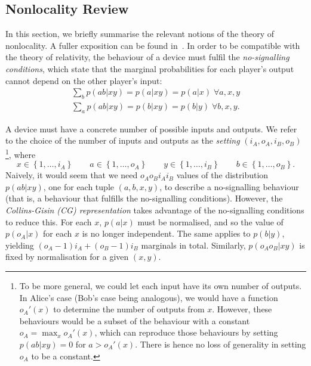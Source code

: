 \documentclass[10pt, a4paper]{article}
\numberwithin{equation}{section} %
\theoremstyle{definition}
\theoremstyle{plain}
\newcommand{\dintv}[2]{\left\{#1,\ldots,#2\right\}}
\newcommand{\?}{\mathrel{?}} %
\begin{document}
  \subsection{Nonlocality Review}\label{sec:pre_nl}

  In this section, we briefly summarise the relevant notions of the theory of nonlocality. A fuller exposition can be found in~\cite{BellNonlocality}. In order to be compatible with the theory of relativity, the behaviour of a device must fulfil the \emph{no-signalling conditions}, which state that the marginal probabilities for each player's output cannot depend on the other player's input:
  \begin{gather}
    \sum_b p(ab|xy) = p(a|xy) = p(a|x)\;\forall a,x,y \\
    \sum_a p(ab|xy) = p(b|xy) = p(b|y)\;\forall b,x,y.
  \end{gather}

  A device must have a concrete number of possible inputs and outputs. We refer to the choice of the number of inputs and outputs as the \emph{setting} \((i_A, o_A, i_B, o_B)\)\footnote{To be more general, we could let each input have its own number of outputs. In Alice's case (Bob's case being analogous), we would have a function \(o_A'(x)\) to determine the number of outputs from \(x\). However, these behaviours would be a subset of the behaviour with a constant \(o_A = \max_x o_A'(x)\), which can reproduce those behaviours by setting \(p(ab|xy) = 0\) for \(a > o_A'(x)\). There is hence no loss of generality in setting \(o_A\) to be a constant.}, where
  \[ x \in \dintv{1}{i_A} \qquad a \in \dintv{1}{o_A} \qquad y \in \dintv{1}{i_B} \qquad b \in \dintv{1}{o_B}. \]
  Naively, it would seem that we need \(o_A o_B i_A i_B\) values of the distribution \(p(ab|xy)\), one for each tuple \((a, b, x, y)\), to describe a no-signalling behaviour (that is, a behaviour that fulfills the no-signalling conditions). However, the \emph{Collins-Gisin (CG) representation} takes advantage of the no-signalling conditions to reduce this. For each \(x\), \(p(a|x)\) must be normalised, and so the value of \(p(o_A|x)\) for each \(x\) is no longer independent. The same applies to \(p(b|y)\), yielding \((o_A-1)i_A + (o_B-1)i_B\) marginals in total. Similarly, \(p(o_A o_B|xy)\) is fixed by normalisation for a given \((x,y)\).
\end{document}
